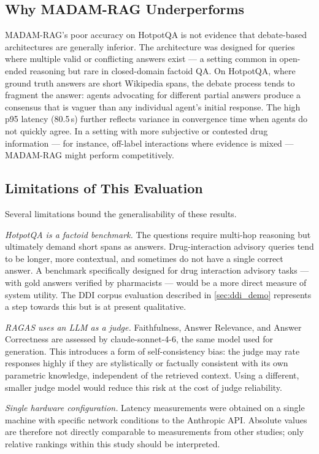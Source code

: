 \subsection{Why MADAM-RAG Underperforms}

MADAM-RAG's poor accuracy on HotpotQA is not evidence that debate-based
architectures are generally inferior.
The architecture was designed for queries where multiple valid or conflicting
answers exist --- a setting common in open-ended reasoning but rare in
closed-domain factoid QA.
On HotpotQA, where ground truth answers are short Wikipedia spans,
the debate process tends to fragment the answer: agents advocating for different
partial answers produce a consensus that is vaguer than any individual agent's
initial response.
The high p95 latency (80.5\,s) further reflects variance in convergence time
when agents do not quickly agree.
In a setting with more subjective or contested drug information --- for instance,
off-label interactions where evidence is mixed --- MADAM-RAG might perform
competitively.

\subsection{Limitations of This Evaluation}
\label{sec:limitations_eval}

Several limitations bound the generalisability of these results.

\emph{HotpotQA is a factoid benchmark.}
The questions require multi-hop reasoning but ultimately demand short spans as
answers.
Drug-interaction advisory queries tend to be longer, more contextual, and
sometimes do not have a single correct answer.
A benchmark specifically designed for drug interaction advisory tasks --- with
gold answers verified by pharmacists --- would be a more direct measure of
system utility.
The DDI corpus evaluation described in \cref{sec:ddi_demo} represents a
step towards this but is at present qualitative.

\emph{RAGAS uses an LLM as a judge.}
Faithfulness, Answer Relevance, and Answer Correctness are assessed by
claude-sonnet-4-6, the same model used for generation.
This introduces a form of self-consistency bias: the judge may rate responses
highly if they are stylistically or factually consistent with its own parametric
knowledge, independent of the retrieved context.
Using a different, smaller judge model would reduce this risk at the cost of
judge reliability.

\emph{Single hardware configuration.}
Latency measurements were obtained on a single machine with specific network
conditions to the Anthropic API.
Absolute values are therefore not directly comparable to measurements from other
studies; only relative rankings within this study should be interpreted.

